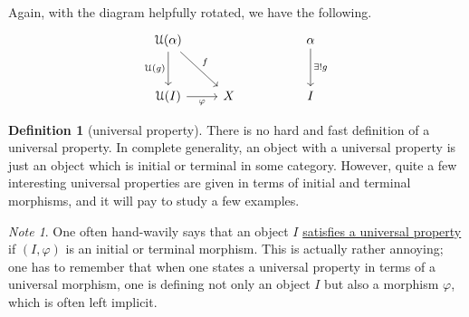 \documentclass[a4paper,10pt]{scrreprt}
\newcommand{\defn}[1]{\ul{#1}}
\theoremstyle{definition}
\newtheorem{definition}{Definition}[section]
\theoremstyle{plain}
\theoremstyle{remark}
\newtheorem{note}{Note}[section]
\begin{document}
Again, with the diagram helpfully rotated, we have the following.
\begin{equation*}
  \begin{tikzcd}[row sep=large]
    \mathcal{U}(\alpha) \arrow[d, swap, "\mathcal{U}(g)"] \arrow[rd, "f"] & & & \alpha \arrow[d, "\exists!g"]\\
    \mathcal{U}(I) \arrow[r, swap, "\varphi"] & X & & I
  \end{tikzcd}
\end{equation*}
\begin{definition}[universal property]
  \label{def:universalproperty}
  There is no hard and fast definition of a universal property. In complete generality, an object with a universal property is just an object which is initial or terminal in some category. However, quite a few interesting universal properties are given in terms of initial and terminal morphisms, and it will pay to study a few examples.
\end{definition}

\begin{note}
  One often hand-wavily says that an object $I$ \defn{satisfies a universal property} if $(I, \varphi)$ is an initial or terminal morphism. This is actually rather annoying; one has to remember that when one states a universal property in terms of a universal morphism, one is defining not only an object $I$ but also a morphism $\varphi$, which is often left implicit.
\end{note}
\end{document}
